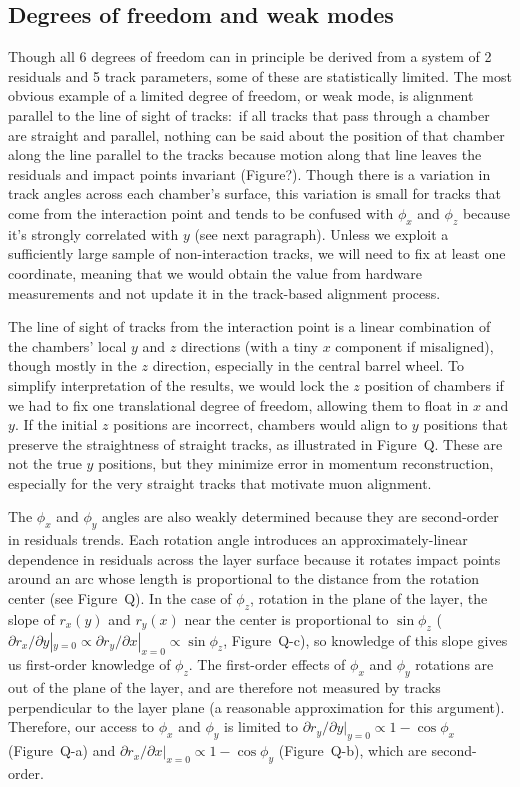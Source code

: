 \documentclass[12pt]{article}
\begin{document}
\subsection{Degrees of freedom and weak modes}

Though all 6 degrees of freedom can in principle be derived from a
system of 2 residuals and 5 track parameters, some of these are
statistically limited.  The most obvious example of a limited degree
of freedom, or weak mode, is alignment parallel to the line of sight
of tracks:~if all tracks that pass through a chamber are straight and
parallel, nothing can be said about the position of that chamber along
the line parallel to the tracks because motion along that line leaves
the residuals and impact points invariant (Figure?).  Though there is
a variation in track angles across each chamber's surface, this
variation is small for tracks that come from the interaction point and
tends to be confused with $\phi_x$ and $\phi_z$ because it's strongly
correlated with $y$ (see next paragraph).  Unless we exploit a
sufficiently large sample of non-interaction tracks, we will need to
fix at least one coordinate, meaning that we would obtain the value
from hardware measurements and not update it in the track-based
alignment process.

The line of sight of tracks from the interaction point is a linear
combination of the chambers' local $y$ and $z$ directions (with a tiny
$x$ component if misaligned), though mostly in the $z$ direction,
especially in the central barrel wheel.  To simplify interpretation of
the results, we would lock the $z$ position of chambers if we had to
fix one translational degree of freedom, allowing them to float in $x$
and $y$.  If the initial $z$ positions are incorrect, chambers would
align to $y$ positions that preserve the straightness of straight
tracks, as illustrated in Figure~Q.  These are not the true $y$
positions, but they minimize error in momentum reconstruction,
especially for the very straight tracks that motivate muon alignment.

The $\phi_x$ and $\phi_y$ angles are also weakly determined because
they are second-order in residuals trends.  Each rotation angle
introduces an approximately-linear dependence in residuals across the
layer surface because it rotates impact points around an arc whose
length is proportional to the distance from the rotation center (see
Figure~Q).  In the case of $\phi_z$, rotation in the plane of the
layer, the slope of $r_x(y)$ and $r_y(x)$ near the center is
proportional to $\sin\phi_z$ ($\partial r_x / \partial y |_{y=0}
\propto \partial r_y / \partial x |_{x=0} \propto \sin\phi_z$,
Figure~Q-c), so knowledge of this slope gives us first-order knowledge
of $\phi_z$.  The first-order effects of $\phi_x$ and $\phi_y$
rotations are out of the plane of the layer, and are therefore not
measured by tracks perpendicular to the layer plane (a reasonable
approximation for this argument).  Therefore, our access to $\phi_x$
and $\phi_y$ is limited to $\partial r_y / \partial y|_{y=0} \propto 1
- \cos\phi_x$ (Figure~Q-a) and $\partial r_x / \partial x |_{x=0}
\propto 1 - \cos\phi_y$ (Figure~Q-b), which are second-order.
\end{document}
